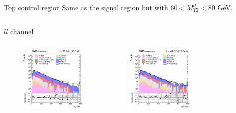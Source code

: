 \documentclass[8pt]{beamer}
\begin{document}
\begin{frame}{Top control region}
\justifying
Same as the signal region but with $60 < M_{T2}^{ll} < 80$ GeV. \vfill

\begin{columns}
\begin{column}{1.09\textwidth}
\begin{block}{\centering $ll$ channel}\end{block}
\end{column}
\end{columns} \vspace{-5pt}

\begin{columns}
		\begin{column}{0.33\textwidth}
			\begin{center}
			\vspace{-8pt}
			\begin{block}{}\end{block}\vspace{10pt}
     			\includegraphics[width=1.0\textwidth, height=90pt]{figs/2016/log_cratio_ttbarCR_ll_mll.png}
    		\end{center}		
		\end{column} 
		\begin{column}{0.33\textwidth}
			\begin{center}
			\vspace{-8pt}
			\begin{block}{}\end{block}\vspace{10pt}
     			\includegraphics[width=1.0\textwidth, height=90pt]{figs/2017/log_cratio_ttbarCR_ll_mll.png}
    		\end{center}		
		\end{column} 
		\begin{column}{0.33\textwidth}

\end{column}
\end{columns}
\end{frame}
\end{document}
